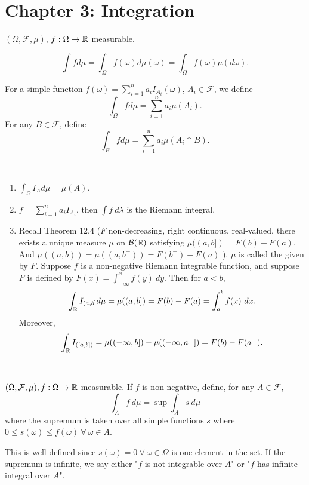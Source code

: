 \documentclass[class=article,crop=false]{standalone}
\begin{document}
\section*{Chapter 3: Integration}

$ (\Omega,\mathcal{F},\mu)$, $ f:\Omega \to \mathbb{R}$ measurable. 
\begin{notation}
	\[ \int f d \mu = \int_{\Omega} f(\omega) d \mu(\omega) = \int_{\Omega} f(\omega) \mu(d\omega).\]
\end{notation}

\begin{defn}[integration]
	For a simple function $ f(\omega)= \sum_{ i= 1}^{ n} a_i I_{A_i}(\omega)$, $ A_i \in \mathcal{F}$, we define
	\[
		\int_{\Omega} f d \mu = \sum_{ i= 1}^{ n} a_i \mu(A_i)
	.\] 
	For any $ B \in \mathcal{F}$, define
	\[
		\int_B f d \mu = \sum_{ i= 1}^{ n} a_i \mu(A_i \cap B)
	.\] 
\end{defn}

\begin{eg}[]
~\begin{enumerate}[label=\arabic*)]
	\item $ \int_{\Omega} I_A d \mu = \mu(A)$.
	\item $ f = \sum_{ i= 1}^{ n} a_i I_{A_i}$, then $ \int f \ d\lambda$ is the Riemann integral.
	\item Recall Theorem 12.4 ($ F$ non-decreasing, right continuous, real-valued, there exists a unique measure $ \mu$ on $ \mathcal{B}(\mathbb{R})$ satisfying $ \mu((a,b])=F(b)-F(a)$. And $ \mu((a,b))=\mu((a,b ^{-}))= F(b ^{-}) - F(a)$ ). $ \mu$ is called the  given by $ F$. Suppose  $ f$ is a non-negative Riemann integrable function, and suppose $ F$ is defined by  $ F(x)=\int_{-\infty}^x f(y)\ dy$. Then for $ a<b$,
		 \[
			 \int_{\mathbb{R}} I_{(a,b]} d \mu = \mu((a,b]) = F(b)-F(a) = \int_a^b f(x) \ dx
		.\]
		Moreover,
		\[
			\int_{\mathbb{R}} I_{([a,b])} =\mu((-\infty,b])-\mu((-\infty,a^-]) = F(b)-F(a^-)
		.\] 
\end{enumerate}
\end{eg}

~\begin{defn}[]
	$ (\Omega,\mathcal{F},\mu), f:\Omega \to \mathbb{R}$ measurable. If $ f$ is non-negative, define, for any  $ A \in \mathcal{F}$,
	\[
	\int_{A} f \ d \mu = \sup \int_A s\ d \mu
	\]
	where the supremum is taken over all simple functions $ s$ where  $ 0\leq s(\omega) \leq f(\omega) \ \forall \ \omega \in A$.
\end{defn}
\begin{note}[]
	This is well-defined since $ s(\omega) =0 \ \forall \ \omega \in \Omega$ is one element in the set. If the supremum is infinite, we say either "$ f$ is not integrable over  $ A$" or "$ f$ has infinite integral over  $ A$".
\end{note}
\end{document}
